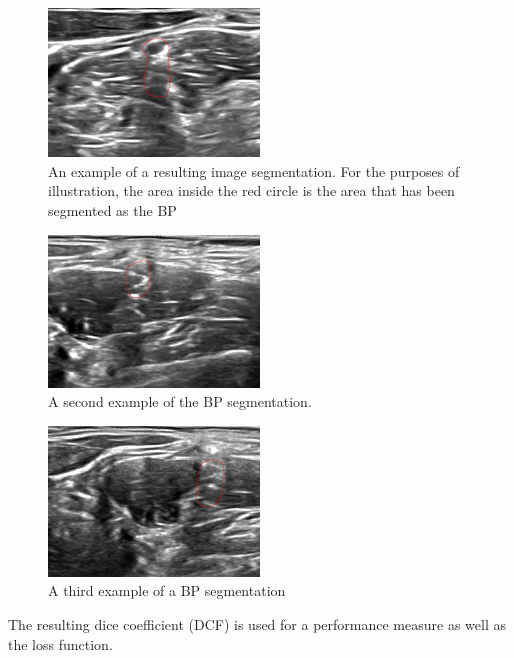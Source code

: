 \documentclass[letterpaper]{article}
\begin{document}
 \begin{figure}[H]
  \centerline{\includegraphics[width=0.5\textwidth]{Images/SegmentExample1.png}}
  \caption{An example of a resulting image segmentation. For the purposes of illustration, the area inside the red circle is the area that has been segmented as the BP}
  \label{fig:BPSegmentation1}
\end{figure}

 \begin{figure}[H]
  \centerline{\includegraphics[width=0.5\textwidth]{Images/SegmentExample2.png}}
  \caption{A second example of the BP segmentation.}
  \label{fig:BPSegmentation2}
\end{figure}

 \begin{figure}[H]
  \centerline{\includegraphics[width=0.5\textwidth]{Images/SegmentExample3.png}}
  \caption{A third example of a BP segmentation}
  \label{fig:BPSegmentation3}
\end{figure}

The resulting dice coefficient (DCF) is used for a performance measure as well as the loss function. 
\end{document}
